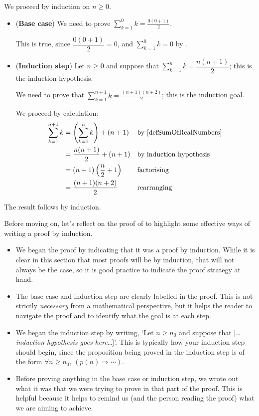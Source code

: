 \begin{cproof}
We proceed by induction on $n \ge 0$.

\begin{itemize}
\item (\textbf{Base case}) We need to prove $\displaystyle\sum_{k=1}^0 k = \frac{0(0+1)}{2}$.

This is true, since $\dfrac{0(0+1)}{2} = 0$, and $\displaystyle\sum_{k=1}^0 k = 0$ by .

\item (\textbf{Induction step}) Let $n \ge 0$ and suppose that $\displaystyle\sum_{k=1}^n k = \dfrac{n(n+1)}{2}$; this is the induction hypothesis.

We need to prove that $\displaystyle\sum_{k=1}^{n+1} k = \frac{(n+1)(n+2)}{2}$; this is the induction goal.

We proceed by calculation:
\begin{align*}
\sum_{k=1}^{n+1} k &= \left( \sum_{k=1}^n k \right) + (n+1) && \text{by \Cref{defSumOfRealNumbers}} \\
&= \frac{n(n+1)}{2} + (n+1) && \text{by induction hypothesis}\\
&= (n+1)\left( \frac{n}{2} + 1 \right) && \text{factorising} \\
&= \frac{(n+1)(n+2)}{2} && \text{rearranging}
\end{align*}
\end{itemize}
The result follows by induction. 
\end{cproof}

Before moving on, let's reflect on the proof of  to highlight some effective ways of writing a proof by induction.

\begin{itemize}
\item We began the proof by indicating that it was a proof by induction. While it is clear in this section that most proofs will be by induction, that will not always be the case, so it is good practice to indicate the proof strategy at hand.
\item The base case and induction step are clearly labelled in the proof. This is not strictly \textit{necessary} from a mathematical perspective, but it helps the reader to navigate the proof and to identify what the goal is at each step.
\item We began the induction step by writing, `Let $n \ge n_0$ and suppose that [\dots{}\textit{induction hypothesis goes here}\dots{}]'. This is typically how your induction step should begin, since the proposition being proved in the induction step is of the form $\forall n \ge n_0,\, (p(n) \Rightarrow \cdots)$.
\item Before proving anything in the base case or induction step, we wrote out what it was that we were trying to prove in that part of the proof. This is helpful because it helps to remind us (and the person reading the proof) what we are aiming to achieve.
\end{itemize}

